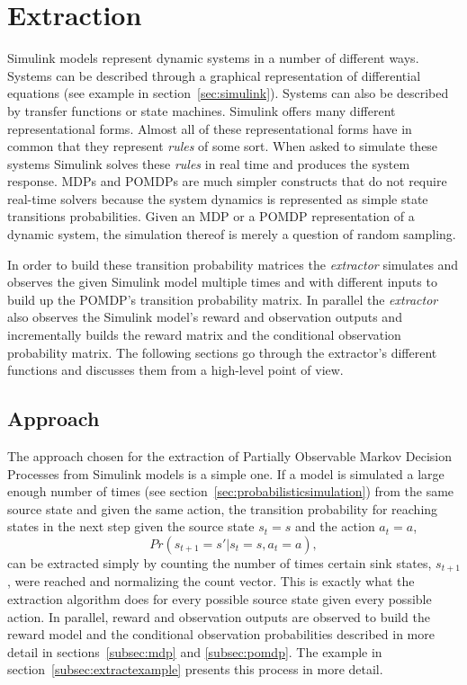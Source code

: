 \section{Extraction}

Simulink models represent dynamic systems in a number of different ways. Systems can be described through a graphical representation of differential equations (see example in section~\ref{sec:simulink}). Systems can also be described by transfer functions or state machines. Simulink offers many different representational forms. Almost all of these representational forms have in common that they represent \textit{rules} of some sort. When asked to simulate these systems Simulink solves these \textit{rules} in real time and produces the system response. MDPs and POMDPs are much simpler constructs that do not require real-time solvers because the system dynamics is represented as simple state transitions probabilities. Given an MDP or a POMDP representation of a dynamic system, the simulation thereof is merely a question of random sampling.

In order to build these transition probability matrices the \textit{extractor} simulates and observes the given Simulink model multiple times and with different inputs to build up the POMDP's transition probability matrix. In parallel the \textit{extractor} also observes the Simulink model's reward and observation outputs and incrementally builds the reward matrix and the conditional observation probability matrix. The following sections go through the extractor's different functions and discusses them from a high-level point of view.

\subsection{Approach}
\label{subsec:approach}

The approach chosen for the extraction of Partially Observable Markov Decision Processes from Simulink models is a simple one. If a model is simulated a large enough number of times (see section~\ref{sec:probabilisticsimulation}) from the same source state and given the same action, the transition probability for reaching states in the next step given the source state $s_t = s$ and the action $a_t = a$,
\[
Pr(s_{t+1} = s'|s_t = s, a_t = a),
\]
can be extracted simply by counting the number of times certain sink states, $s_{t+1}$, were reached and normalizing the count vector. This is exactly what the extraction algorithm does for every possible source state given every possible action. In parallel, reward and observation outputs are observed to build the reward model and the conditional observation probabilities described in more detail in sections~\ref{subsec:mdp} and \ref{subsec:pomdp}. The example in section~\ref{subsec:extractexample} presents this process in more detail.

